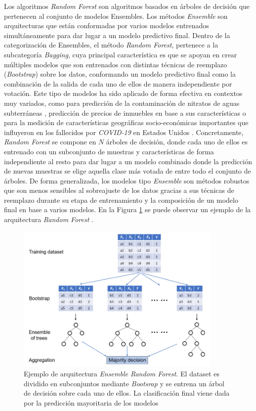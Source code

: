 Los algoritmos \textit{Random Forest} son algoritmos basados en árboles de decisión que pertenecen al conjunto de modelos Ensembles. Los métodos \textit{Ensemble} son arquitecturas que están conformadas por varios modelos entrenados simultáneamente para dar lugar a un modelo predictivo final. Dentro de la categorización de Ensembles, el método \textit{Random Forest}, pertenece a la subcategoría \textit{Bagging}, cuya principal característica es que se apoyan en crear múltiples modelos que son entrenados con distintas técnicas de reemplazo (\textit{Bootstrap}) sobre los datos, conformando un modelo predictivo final como la combinación de la salida de cada uno de ellos de manera independiente por votación. Este tipo de modelos ha sido aplicado de forma efectiva en contextos muy variados, como para predicción de la contaminación de nitratos de aguas subterráneas \cite{HE2022133388}, predicción de precios de inmuebles en base a sus características \cite{ADETUNJI2022806} o para la medición de características geográficas socio-económicas importantes que influyeron en los fallecidos por \textit{COVID-19} en Estados Unidos \cite{GREKOUSIS2022102744}. Concretamente, \textit{Random Forest} se compone en $N$ árboles de decisión, donde cada uno de ellos es entrenado con un subconjunto de muestras y características de forma independiente al resto para dar lugar a un modelo combinado donde la predicción de nuevas muestras se elige aquella clase más votada de entre todo el conjunto de árboles. De forma generalizada, los modelos tipo \textit{Ensemble} son métodos robustos que son menos sensibles al sobreajuste de los datos gracias a sus técnicas de reemplazo durante su etapa de entrenamiento y la composición de un modelo final en base a varios modelos. En la Figura \ref{RF_BACKGROUND} se puede observar un ejemplo de la arquitectura \textit{Random Forest} \cite{MISRA2020243}.


\begin{figure}[H]
	\centering
	\includegraphics[width=10cm]{Figures/Background/RF.png}
	\caption[Ejemplo de arquitectura \textit{Ensemble Random Forest}]{Ejemplo de arquitectura \textit{Ensemble Random Forest}. El dataset es dividido en subconjuntos mediante \textit{Bootsrap} y se entrena un árbol de decisión sobre cada uno de ellos. La clasificación final viene dada por la predicción mayoritaria de los modelos}
	\label{RF_BACKGROUND}
\end{figure}

